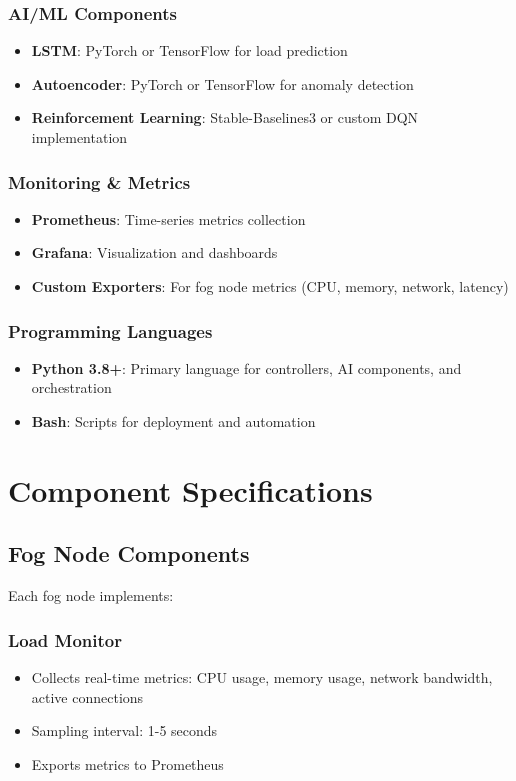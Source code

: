 \documentclass[11pt,a4paper]{article}
\begin{document}
\subsubsection{AI/ML Components}
\begin{itemize}
    \item \textbf{LSTM}: PyTorch or TensorFlow for load prediction
    \item \textbf{Autoencoder}: PyTorch or TensorFlow for anomaly detection
    \item \textbf{Reinforcement Learning}: Stable-Baselines3 or custom DQN implementation
\end{itemize}

\subsubsection{Monitoring \& Metrics}
\begin{itemize}
    \item \textbf{Prometheus}: Time-series metrics collection
    \item \textbf{Grafana}: Visualization and dashboards
    \item \textbf{Custom Exporters}: For fog node metrics (CPU, memory, network, latency)
\end{itemize}

\subsubsection{Programming Languages}
\begin{itemize}
    \item \textbf{Python 3.8+}: Primary language for controllers, AI components, and orchestration
    \item \textbf{Bash}: Scripts for deployment and automation
\end{itemize}

\section{Component Specifications}

\subsection{Fog Node Components}

Each fog node implements:

\subsubsection{Load Monitor}
\begin{itemize}
    \item Collects real-time metrics: CPU usage, memory usage, network bandwidth, active connections
    \item Sampling interval: 1-5 seconds
    \item Exports metrics to Prometheus
\end{itemize}
\end{document}
